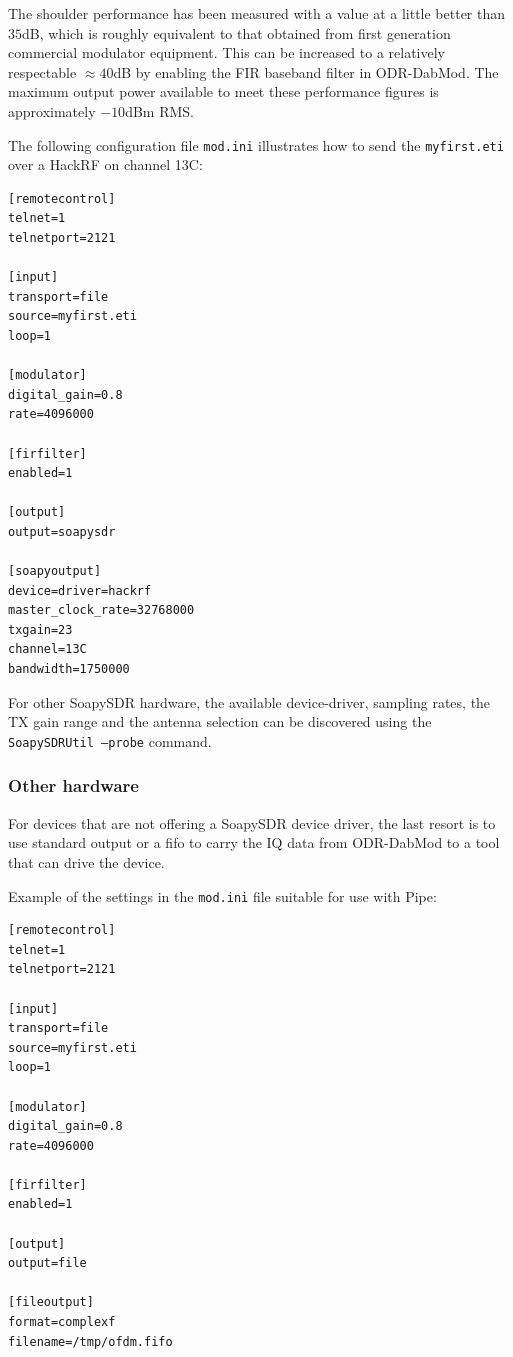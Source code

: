 The shoulder performance has been measured with a value at a little
better than $35$dB, which is roughly equivalent to that obtained from first
generation commercial modulator equipment. This can be increased to a relatively
respectable $\approx 40$dB by enabling the FIR baseband filter in ODR-DabMod.
The maximum output power available to meet these performance figures is
approximately $-10$dBm RMS.

The following configuration file \texttt{mod.ini}
illustrates how to send the \texttt{myfirst.eti} over a HackRF on channel
13C:

\begin{lstlisting}
[remotecontrol]
telnet=1
telnetport=2121

[input]
transport=file
source=myfirst.eti
loop=1

[modulator]
digital_gain=0.8
rate=4096000

[firfilter]
enabled=1

[output]
output=soapysdr

[soapyoutput]
device=driver=hackrf
master_clock_rate=32768000
txgain=23
channel=13C
bandwidth=1750000
\end{lstlisting}


For other SoapySDR hardware, the available device-driver, sampling rates, the 
TX gain range and the antenna selection can be discovered using the 
\texttt{SoapySDRUtil --probe} command.

\subsubsection{Other hardware}
For devices that are not offering a SoapySDR device driver, the last resort is
to use standard output or a fifo to carry the IQ data from ODR-DabMod to a tool
that can drive the device.

Example of the settings in the \texttt{mod.ini} file suitable for use with Pipe:

\begin{lstlisting}
[remotecontrol]
telnet=1
telnetport=2121

[input]
transport=file
source=myfirst.eti
loop=1

[modulator]
digital_gain=0.8
rate=4096000

[firfilter]
enabled=1

[output]
output=file

[fileoutput]
format=complexf
filename=/tmp/ofdm.fifo

\end{lstlisting}

